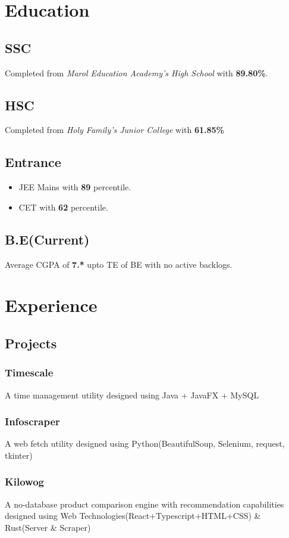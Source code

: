 \documentclass{article}
\begin{document}
	\section{Education}
		\subsection{SSC} 
			Completed from \emph{Marol Education Academy's High School} with \textbf{89.80\%}.
		\subsection{HSC} 
			Completed from \emph{Holy Family's Junior College} with \textbf{61.85\%}
		\subsection{Entrance} 
			\begin{itemize}
				\item JEE Mains with \textbf{89} percentile.
				\item CET with \textbf{62} percentile.
			\end{itemize}
		\subsection{B.E(Current)}
			Average CGPA of \textbf{7.*} upto TE of BE with no active backlogs.
	\section{Experience}
		\subsection{Projects}
				\subsubsection{Timescale} 
					A time management utility designed using Java + JavaFX + MySQL
				\subsubsection{Infoscraper} 
					A web fetch utility designed using Python(BeautifulSoup, Selenium, request, tkinter)
				\subsubsection{Kilowog} 
					A no-database product comparison engine with recommendation capabilities 
					designed using Web Technologies(React+Typescript+HTML+CSS) \& Rust(Server \& Scraper)
\end{document}
